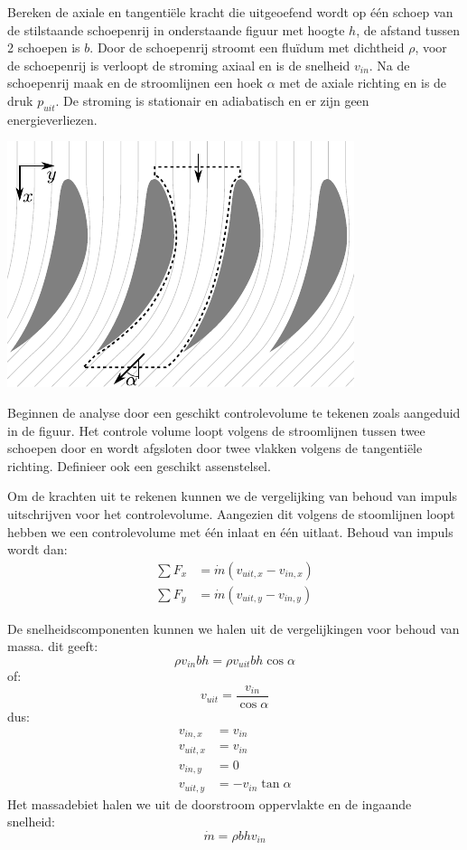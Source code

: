 \begin{voorbeeld}
	Bereken de axiale en tangentiële kracht die uitgeoefend wordt op één schoep van de stilstaande schoepenrij in onderstaande figuur met hoogte $h$, de afstand tussen 2 schoepen is $b$. Door de schoepenrij stroomt een fluïdum met dichtheid $\rho$, voor de schoepenrij is verloopt de stroming axiaal en is de snelheid $v_{in}$. Na de schoepenrij maak en de stroomlijnen een hoek $\alpha$ met de axiale richting en is de druk $p_{uit}$. De stroming is stationair en adiabatisch en er zijn geen energieverliezen.
	\begin{center}
		\includegraphics{fig/controlevolumes/Schoepenrij}
	\end{center}

	Beginnen de analyse door een geschikt controlevolume te tekenen zoals aangeduid in de figuur. Het controle volume loopt volgens de stroomlijnen tussen twee schoepen door en wordt afgsloten door twee vlakken volgens de tangentiële richting. Definieer ook een geschikt assenstelsel.

	Om de krachten uit te rekenen kunnen we de vergelijking van behoud van impuls uitschrijven voor het controlevolume. Aangezien dit volgens de stoomlijnen loopt hebben we een controlevolume met één inlaat en één uitlaat. Behoud van impuls wordt dan:
	\begin{align*}
		\sum F_x &= \dot{m} \left(v_{uit,x} - v_{in,x}\right) \\
		\sum F_y &= \dot{m} \left(v_{uit,y} - v_{in,y}\right)
	\end{align*}

	De snelheidscomponenten kunnen we halen uit de vergelijkingen voor behoud van massa. dit geeft:
	\begin{equation*}
		\rho v_{in} b h = \rho v_{uit} b h \cos \alpha
	\end{equation*}
	of:
	\begin{equation*}
		v_{uit} = \frac{v_{in}}{\cos \alpha}
	\end{equation*}
	dus:
	\begin{align*}
		v_{in,x}  &= v_{in}\\
		v_{uit,x} &= v_{in}\\
		v_{in,y}  &= 0\\
		v_{uit,y} &= -v_{in}\tan \alpha
	\end{align*}
	Het massadebiet halen we uit de doorstroom oppervlakte en de ingaande snelheid:
	\begin{equation*}
		\dot{m} = \rho b h v_{in}
	\end{equation*}


\end{voorbeeld}
